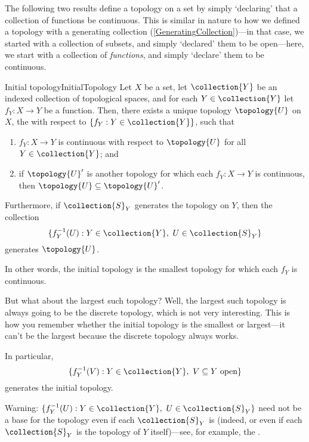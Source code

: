 The following two results define a topology on a set by simply `declaring' that a collection of functions be continuous.  This is similar in nature to how we defined a topology with a generating collection (\cref{GeneratingCollection})---in that case, we started with a collection of subsets, and simply `declared' them to be open---here, we start with a collection of \emph{functions}, and simply `declare' them to be continuous.
\begin{prp}{Initial topology}{InitialTopology}
Let $X$ be a set, let $\collection{Y}$ be an indexed collection of topological spaces, and for each $Y\in \collection{Y}$ let $f_Y:X\rightarrow Y$ be a function.  Then, there exists a unique topology  $\topology{U}$ on $X$, the  with respect to $\{ f_Y:Y\in \collection{Y}\}$, such that
\begin{enumerate}
\item $f_Y:X\rightarrow Y$ is continuous with respect to $\topology{U}$ for all $Y\in \collection{Y}$; and
\item if $\topology{U}'$ is another topology for which each $f_Y:X\rightarrow Y$ is continuous, then $\topology{U}\subseteq \topology{U}'$.
\end{enumerate}
Furthermore, if $\collection{S}_Y$ generates the topology on $Y$, then the collection
\begin{equation}
\{ f_Y^{-1}(U):Y\in \collection{Y},\ U\in \collection{S}_Y\}
\end{equation}
generates $\topology{U}$.
\begin{rmk}
In other words, the initial topology is the smallest topology for which each $f_Y$ is continuous.
\end{rmk}
\begin{rmk}
But what about the largest such topology?  Well, the largest such topology is always going to be the discrete topology, which is not very interesting.  This is how you remember whether the initial topology is the smallest or largest---it can't be the largest because the discrete topology always works.
\end{rmk}
\begin{rmk}
In particular,
\begin{equation}
\{ f_Y^{-1}(V):Y\in \collection{Y},\ V\subseteq Y\text{ open}\}
\end{equation}
generates the initial topology.
\end{rmk}
\begin{wrn}
Warning:  $\{ f_Y^{-1}(U):Y\in \collection{Y},\ U\in \collection{S}_Y\}$ need not be a base for the topology even if each $\collection{S}_Y$ is (indeed, or even if each $\collection{S}_Y$ is the topology of $Y$ itself)---see, for example, the .

\end{wrn}
\end{prp}
